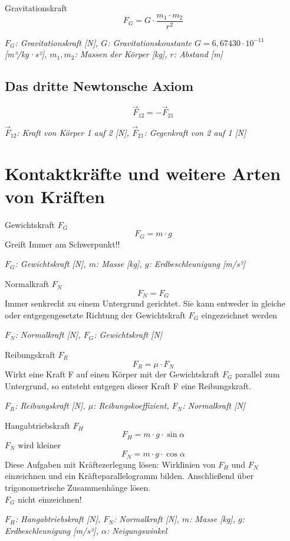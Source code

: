 \documentclass[a4paper,10pt]{article}
\newenvironment{displayformula}
{
	\begin{framed}
		\color{formulaColor}
	}
	{\end{framed}}
\newcommand{\formulalegend}[1]{%
	\par\vspace{0.5ex}%
	{{\color{legendColor}\RaggedRight\small\textit{#1}}}%
	\par\vspace{1.5ex}%
}
\begin{document}
\begin{displayformula}
	Gravitationskraft
	\[
	F_G = G \cdot \frac{m_1 \cdot m_2}{r^2}
	\]
\end{displayformula}
\formulalegend{
	\( F_G \): Gravitationskraft [N], \( G \): Gravitationskonstante $G = 6,67430 \cdot 10^{-11}$[m³/kg·s²], \( m_1, m_2 \): Massen der Körper [kg], \( r \): Abstand [m]
}

\subsection{Das dritte Newtonsche Axiom}

\begin{displayformula}
	\[
	\vec{F}_{12} = -\vec{F}_{21}
	\]
\end{displayformula}
\formulalegend{
	\( \vec{F}_{12} \): Kraft von Körper 1 auf 2 [N], \( \vec{F}_{21} \): Gegenkraft von 2 auf 1 [N]
}



\section{Kontaktkräfte und weitere Arten von Kräften}

\begin{displayformula}
	Gewichtskraft \( F_G \)
	\[
	F_G = m \cdot g
	\]
	Greift Immer am Schwerpunkt!!
\end{displayformula}
\formulalegend{
	\( F_G \): Gewichtskraft [N], \( m \): Masse [kg], \( g \): Erdbeschleunigung [m/s²]
}

\begin{displayformula}
	Normalkraft \( F_N \) 
	\[
	F_N = F_G
	\]
	Immer senkrecht zu einem Untergrund gerichtet. Sie kann entweder in gleiche oder entgegengesetzte Richtung der Gewichtskraft $F_G$ eingezeichnet werden
\end{displayformula}
\formulalegend{
	\( F_N \): Normalkraft [N], \( F_G \): Gewichtskraft [N]
}

\begin{displayformula}
	Reibungskraft \( F_R \)
	\[
	F_R = \mu \cdot F_N
	\]
	Wirkt eine Kraft F auf einen Körper mit der Gewichtskraft $F_G$ parallel zum Untergrund, so entsteht entgegen dieser Kraft F eine Reibungskraft. 
\end{displayformula}
\formulalegend{
	\( F_R \): Reibungskraft [N], \( \mu \): Reibungskoeffizient, \( F_N \): Normalkraft [N]
}

\begin{displayformula}
	Hangabtriebskraft \( F_H \)
	\[
	F_H = m \cdot g \cdot \sin\alpha
	\]
	\( F_N \) wird kleiner
	\[
	F_N = m \cdot g \cdot \cos\alpha
	\]
	Diese Aufgaben mit Kräftezerlegung lösen: Wirklinien von $F_H$ und $F_N$ einzeichnen und ein Kräfteparallelogramm bilden. Anschließend über trigonometrische Zusammenhänge lösen. \\ $F_G$ nicht einzeichnen!
\end{displayformula}
\formulalegend{
	\( F_H \): Hangabtriebskraft [N], \( F_N \): Normalkraft [N], \( m \): Masse [kg], \( g \): Erdbeschleunigung [m/s²], \( \alpha \): Neigungswinkel
}
\end{document}
